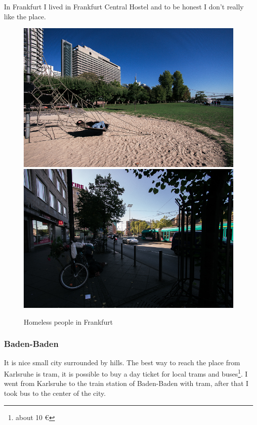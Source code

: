 \documentclass[english]{article}
\begin{document}
In Frankfurt I lived in Frankfurt Central Hostel and to be honest I don't really like the place.

\begin{figure}
\includegraphics[scale=0.33]{Germany_travel/fk3}\includegraphics[scale=0.33]{Germany_travel/fk4}\\
\caption{Homeless people in Frankfurt}
\end{figure}

\subsubsection{Baden-Baden}
It is nice small city surrounded by hills. The best way to reach the place from Karlsruhe is tram, it is possible to buy a day ticket for local trams and buses\footnote{about 10 \euro}. I went from Karlsruhe to the train station of Baden-Baden with tram, after that I took bus to the center of the city.\\
\end{document}

